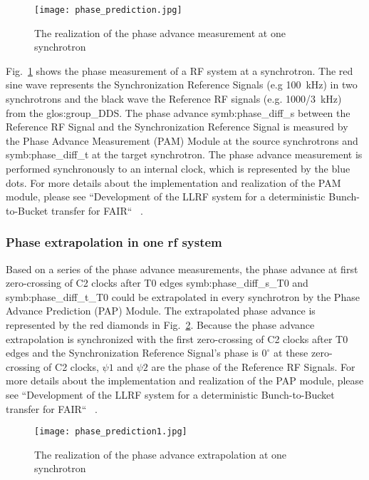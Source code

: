 \begin{figure}[H]
   \centering   
   \texttt{[image: phase\_prediction.jpg]}
   \caption{The realization of the phase advance measurement at one synchrotron}
   \label{phase_prediction}
\end{figure}

Fig.~\ref{phase_prediction} shows the phase measurement of a RF system at a synchrotron. The red sine wave represents the Synchronization Reference Signals (e.g \SI{100}{kHz}) in two synchrotrons and the black wave the Reference RF signals (e.g. \SI{1000/3}{kHz}) from the \gls{glos:group_DDS}. The phase advance \gls{symb:phase_diff_s} between the Reference RF Signal and the Synchronization Reference Signal is measured by the Phase Advance Measurement (\gls{PAM}) Module at the source synchrotrons and \gls{symb:phase_diff_t} at the target synchrotron. The phase advance measurement is performed synchronously to an internal clock, which is represented by the blue dots. For more details about the implementation and realization of the PAM module, please see ``Development of the LLRF system for a deterministic Bunch-to-Bucket transfer for FAIR`` ~\cite{ferrand_development_????}. 
\subsubsection{Phase extrapolation in one rf system}
Based on a series of the phase advance measurements, the phase advance at first zero-crossing of C2 clocks after T0 edges \gls{symb:phase_diff_s_T0} and \gls{symb:phase_diff_t_T0} could be extrapolated in every synchrotron by the Phase Advance Prediction (\gls{PAP}) Module. The extrapolated phase advance is represented by the red diamonds in Fig.~\ref{phase_prediction1}. Because the phase advance extrapolation is synchronized with the first zero-crossing of C2 clocks after T0 edges and the Synchronization Reference Signal's phase is $0^\circ$ at these zero-crossing of C2 clocks, $\psi1$ and $\psi2$ are the phase of the Reference RF Signals. For more details about the implementation and realization of the PAP module, please see ``Development of the LLRF system for a deterministic Bunch-to-Bucket transfer for FAIR`` ~\cite{ferrand_development_????}.   
\begin{figure}[H]
   \centering   
   \texttt{[image: phase\_prediction1.jpg]}
   \caption{The realization of the phase advance extrapolation at one synchrotron}
   \label{phase_prediction1}
\end{figure}
